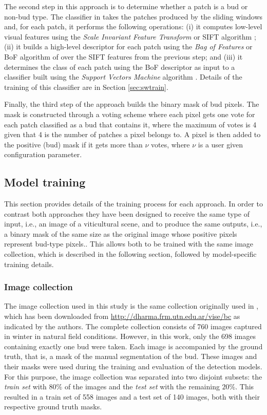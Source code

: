 \documentclass[a4paper,authoryear,review]{elsarticle}
\begin{document}
	The second step in this approach is to determine whether a patch is a bud or non-bud type. The classifier in  \citet{perez2017image} takes the patches produced by the sliding windows and, for each patch, it performs the following operations: (i) it computes low-level visual features using the \emph{Scale Invariant Feature Transform} or SIFT algorithm \citep{lowe2004distinctive}; (ii) it builds a high-level descriptor for each patch using the \emph{Bag of Features} or BoF algorithm of \citet{csurka2004visual} over  the SIFT features from the previous step; and (iii) it determines the class of each patch using the BoF descriptor as input to a  classifier built using the \emph{Support Vectors Machine} algorithm \citep{vapnik2013nature}. Details of the training of this classifier are in Section \ref{sec:swtrain}.
	
	Finally, the third step of the approach builds the binary mask of bud pixels. The mask is constructed through a voting scheme where each pixel gets one vote for each patch classified as a bud that contains it, where the maximum of votes is 4 given that 4 is the number of patches a pixel belongs to. A pixel is then added to the positive (bud) mask if it gets more than $\nu$ votes, where $\nu$ is a user given configuration parameter.
	
	\subsection{Model training}
	\label{sec:train}
	
	This section provides details of the training process for each approach. In order to contrast both approaches they have been designed to receive the same type of input, i.e., an image of a viticultural scene, and to produce the same outputs, i.e., a binary mask of the same size as the original image whose positive pixels represent bud-type pixels.. This allows both to be trained with the same image collection, which is described in the following section, followed by model-specific training details.
	
	\subsubsection{Image collection}
	\label{sec:collection}
	
	The image collection used in this study is the same collection originally used in \citet{perez2017image}, which has been downloaded from \url{
		http://dharma.frm.utn.edu.ar/vise/bc} as indicated by the authors. The complete collection consists of 760 images captured in winter in natural field conditions. However, in this work, only the 698 images containing exactly one bud were taken. Each image is accompanied by the ground truth, that is, a mask of the  manual segmentation of the bud. These images and their masks were used during the training and evaluation of the detection models. For this purpose, the image collection was separated into two disjoint subsets: the \emph{train set} with $80\%$ of the images and the \emph{test set} with the remaining  $20\%$. This resulted in a train set of 558 images and a test set of 140 images, both with their respective ground truth masks.
\end{document}
